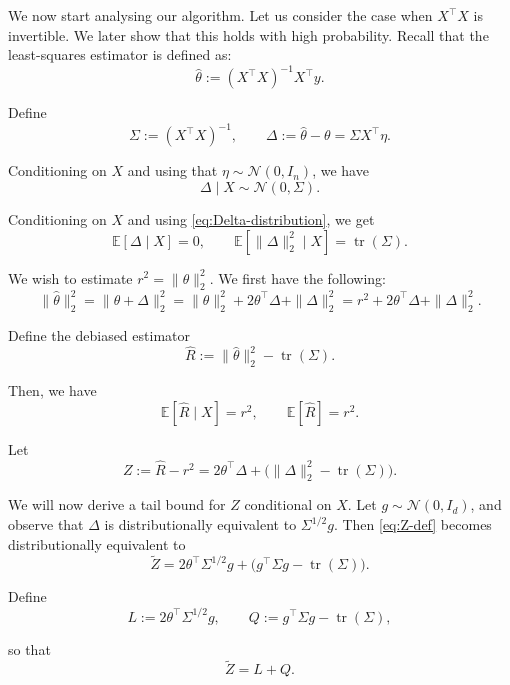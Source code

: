 We now start analysing our algorithm. Let us consider the case when $X^\top X$ is invertible. We later show that this holds with high probability. Recall that the least-squares estimator is defined as:
\[
\hat\theta := (X^\top X)^{-1} X^\top y.
\]

Define
\[
\Sigma := (X^\top X)^{-1}, \qquad \Delta := \hat\theta - \theta = \Sigma X^\top \eta.
\]

Conditioning on $X$ and using that $\eta \sim \mathcal{N}(0,I_n)$, we have
\begin{equation}
\Delta \mid X \sim \mathcal{N}(0,\Sigma).
\label{eq:Delta-distribution}
\end{equation}


Conditioning on $X$ and using \eqref{eq:Delta-distribution}, we get
\[
\mathbb{E}[\Delta \mid X] = 0,
\qquad
\mathbb{E}[\|\Delta\|_2^2 \mid X] = \operatorname{tr}(\Sigma).
\]

We wish to estimate $r^2 = \|\theta\|_2^2$. We first have the following:
\[
\|\hat\theta\|_2^2
= \|\theta + \Delta\|_2^2
= \|\theta\|_2^2 + 2\theta^\top\Delta + \|\Delta\|_2^2
= r^2 + 2\theta^\top\Delta + \|\Delta\|_2^2.
\]

Define the debiased estimator
\begin{equation}
\widehat{R} := \|\hat\theta\|_2^2 - \operatorname{tr}(\Sigma).
\label{eq:r2-hat-def}
\end{equation}

Then, we have
\[
\mathbb{E}[\widehat{R} \mid X] = r^2,
\qquad
\mathbb{E}[\widehat{R}] = r^2.
\]

Let
\begin{equation}
Z := \widehat{R} - r^2
= 2\theta^\top\Delta + \big(\|\Delta\|_2^2 - \operatorname{tr}(\Sigma)\big).
\label{eq:Z-def}
\end{equation}







We will now derive a tail bound for $Z$ conditional on $X$. Let $g \sim \mathcal{N}(0,I_d)$, and observe that $\Delta$ is distributionally equivalent to $\Sigma^{1/2} g$. Then \eqref{eq:Z-def} becomes distributionally equivalent to
\[
\tilde Z
= 2\theta^\top\Sigma^{1/2} g
 + \big(g^\top\Sigma g - \operatorname{tr}(\Sigma)\big).
\]

Define
\[
L := 2\theta^\top\Sigma^{1/2} g,
\qquad
Q := g^\top\Sigma g - \operatorname{tr}(\Sigma),
\]

so that
\[
\tilde Z = L + Q.
\]


